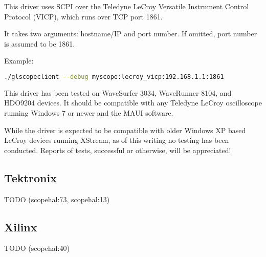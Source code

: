 This driver uses SCPI over the Teledyne LeCroy Versatile Instrument Control Protocol (VICP), which runs over TCP port
1861.

It takes two arguments: hostname/IP and port number. If omitted, port number is assumed to be 1861.

Example:
\begin{lstlisting}[language=sh]
./glscopeclient --debug myscope:lecroy_vicp:192.168.1.1:1861
\end{lstlisting}

This driver has been tested on WaveSurfer 3034, WaveRunner 8104, and HDO9204 devices. It should be compatible with any
Teledyne LeCroy oscilloscope running Windows 7 or newer and the MAUI software.

While the driver is expected to be compatible with older Windows XP based LeCroy devices running XStream, as of this
writing no testing has been conducted. Reports of tests, successful or otherwise, will be appreciated!

\subsection{Tektronix}
TODO (scopehal:73, scopehal:13)

\subsection{Xilinx}
TODO (scopehal:40)
